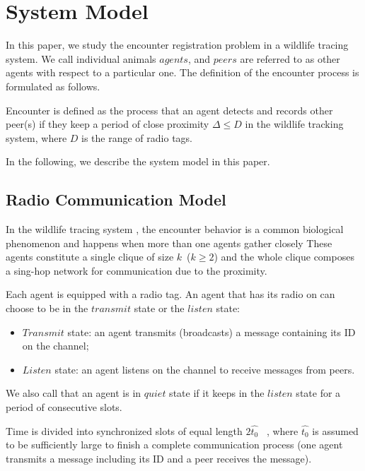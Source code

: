 \section{System Model}
\label{sectionmodel}

In this paper, we study the encounter registration problem in a wildlife 
tracing system. We call individual animals $agents$, 
and $peers$ are referred to as other agents with respect to 
a particular one.
The definition of the encounter process is formulated as follows.
\begin{definition}
Encounter is defined as the process that 
an agent detects and records other peer(s) if they keep a period of 
close proximity $\Delta \leq D$
in the wildlife tracking system, where $D$ is the range of radio tags. 
\end{definition}

In the following, we describe the system model in this paper.

\subsection{Radio Communication Model}


In the  wildlife tracing system {\sysname}, the encounter behavior  
is a common biological phenomenon and
happens when more than one agents gather closely
These agents constitute a 
single clique of size $k$~($k \geq 2$) and the whole 
clique composes a sing-hop network for communication due to the proximity. 

Each agent is equipped with a radio tag. 
An agent that has its radio on can choose to be in the $transmit$ state
or the $listen$ state:
\begin{itemize}
    \item $Transmit$ state: an agent transmits (broadcasts) 
    a message containing its ID on the channel;
    \item $Listen$ state: an agent listens on 
    the channel to receive messages from peers.
\end{itemize}
We also call that an agent is in $quiet$ state if it 
keeps in the $listen$ state for a period of consecutive slots. 

Time is divided into synchronized slots of equal 
length $2\hat{t_0}$~\cite{Xu2005Lightweight, Sivrikaya2004Time}
, where $\hat{t_0}$ is assumed to be sufficiently large to finish a complete
communication process (one agent transmits a message including its ID and
a peer receives the message).

